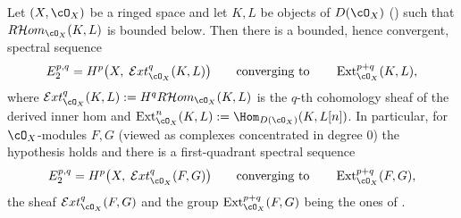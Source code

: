 \begin{lemma}
\label{lem:pc-local-to-global-ext}
Let $(X,\cO_X)$ be a ringed space and let $K,L$ be objects of $D(\cO_X)$
() such that $R\mathcal{H}om_{\cO_X}(K,L)$ is
bounded below.  Then there is a bounded, hence convergent, spectral sequence
\[
E_2^{p,q}=H^p\bigl(X,\;\mathcal{E}xt^{q}_{\cO_X}(K,L)\bigr)
\qquad\text{converging to}\qquad
\operatorname{Ext}^{p+q}_{\cO_X}(K,L),
\]
where $\mathcal{E}xt^{q}_{\cO_X}(K,L):=H^qR\mathcal{H}om_{\cO_X}(K,L)$ is the
$q$-th cohomology sheaf of the derived inner hom and
$\operatorname{Ext}^{n}_{\cO_X}(K,L):=\Hom_{D(\cO_X)}(K,L[n])$.
In particular, for $\cO_X$-modules $F,G$ (viewed as complexes concentrated in
degree $0$) the hypothesis holds and there is a first-quadrant spectral
sequence
\[
E_2^{p,q}=H^p\bigl(X,\;\mathcal{E}xt^{q}_{\cO_X}(F,G)\bigr)
\qquad\text{converging to}\qquad
\operatorname{Ext}^{p+q}_{\cO_X}(F,G),
\]
the sheaf $\mathcal{E}xt^{q}_{\cO_X}(F,G)$ and the group
$\operatorname{Ext}^{p+q}_{\cO_X}(F,G)$ being the ones of
.
\end{lemma}
